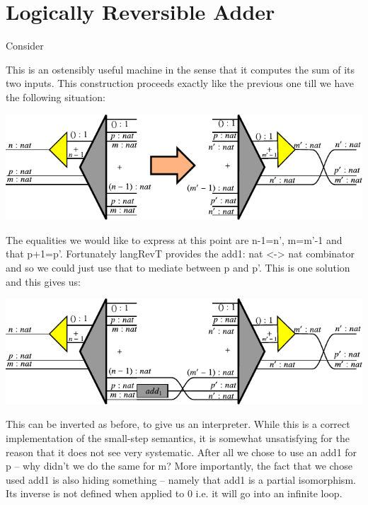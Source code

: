 \documentclass{llncs}
\begin{document}
{\section{Logically Reversible Adder}

Consider

\begin{multicols}{2}  

\end{multicols}



This is an ostensibly useful machine in the sense that it computes the
sum of its two inputs.  This construction proceeds exactly like the
previous one till we have the following situation:

\begin{center}
  \includegraphics{diagrams/adder1.pdf}
\end{center}

The equalities we would like to express at this point are {{n-1=n'}},
{{m=m'-1}} and that {{p+1=p'}}. Fortunately {{langRevT}} provides the
{{add1: nat <-> nat}} combinator and so we could just use that to
mediate between {{p}} and {{p'}}. This is one solution and this gives
us:

\begin{center}
  \includegraphics{diagrams/adder2.pdf}
\end{center}

This can be inverted as before, to give us an interpreter. While this
is a correct implementation of the small-step semantics, it is
somewhat unsatisfying for the reason that it does not see very
systematic. After all we chose to use an {{add1}} for {{p}} -- why
didn't we do the same for {{m}}? More importantly, the fact that we
chose used {{add1}} is also hiding something -- namely that {{add1}}
is a partial isomorphism. Its inverse is not defined when applied to
{{0}} i.e. it will go into an infinite loop. 

}
\end{document}
